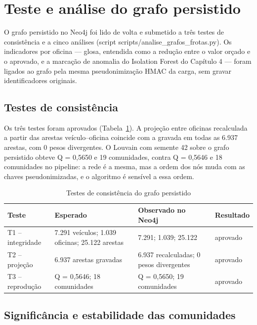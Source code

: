 \section{Teste e análise do grafo persistido}
\label{sec:grafos-teste}
O grafo persistido no Neo4j foi lido de volta e submetido a três testes de consistência e a cinco análises (script scripts/analise\_grafos\_frotas.py). Os indicadores por oficina — glosa, entendida como a redução entre o valor orçado e o aprovado, e a marcação de anomalia do Isolation Forest do Capítulo 4 — foram ligados ao grafo pela mesma pseudonimização HMAC da carga, sem gravar identificadores originais.

\subsection{Testes de consistência}

Os três testes foram aprovados (Tabela~\ref{tab:grafos-testes}). A projeção entre oficinas recalculada a partir das arestas veículo–oficina coincide com a gravada em todas as 6.937 arestas, com 0 pesos divergentes. O Louvain com semente 42 sobre o grafo persistido obteve Q = 0,5650 e 19 comunidades, contra Q = 0,5646 e 18 comunidades no pipeline: a rede é a mesma, mas a ordem dos nós muda com as chaves pseudonimizadas, e o algoritmo é sensível a essa ordem.

\begin{table}[H]
\centering\small
\caption{Testes de consistência do grafo persistido}
\label{tab:grafos-testes}
\begin{tabular}{lp{}p{}p{}}
\hline
\textbf{Teste} & \textbf{Esperado} & \textbf{Observado no Neo4j} & \textbf{Resultado} \\ \hline
T1 – integridade & 7.291 veículos; 1.039 oficinas; 25.122 arestas & 7.291; 1.039; 25.122 & aprovado \\
T2 – projeção & 6.937 arestas gravadas & 6.937 recalculadas; 0 pesos divergentes & aprovado \\
T3 – reprodução & Q = 0,5646; 18 comunidades & Q = 0,5650; 19 comunidades & aprovado \\
\hline
\end{tabular}
\end{table}

\subsection{Significância e estabilidade das comunidades}

